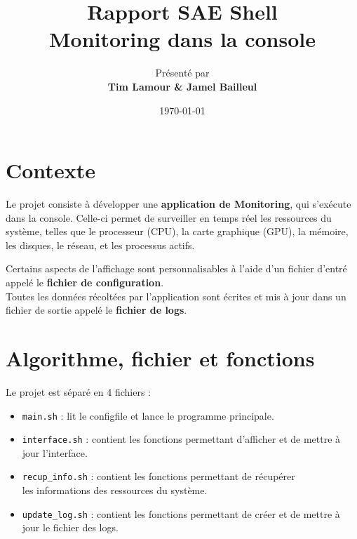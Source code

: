 \documentclass{article}
\title{\Huge \textbf{Rapport SAE Shell} \\[0.5cm] \Large Monitoring dans la console}
\author{\large Présenté par\\ \textbf{Tim Lamour \& Jamel Bailleul}}
\date{\today}
\begin{document}
\maketitle %
\tableofcontents %
\newpage

\section{Contexte}
Le projet consiste à développer une \textbf{application de Monitoring}, qui s'exécute dans la console.
Celle-ci permet de surveiller en temps réel les ressources du système, telles que le processeur (CPU), la carte graphique (GPU), la mémoire, les disques, le réseau, et les processus actifs.
\vspace{1em}

Certains aspects de l'affichage sont personnalisables à l'aide d'un fichier d'entré appelé le \textbf{fichier de configuration}.
\\
Toutes les données récoltées par l'application sont écrites et mis à jour dans un fichier de sortie appelé le \textbf{fichier de logs}.

\section{Algorithme, fichier et fonctions}
Le projet est séparé en 4 fichiers :
\begin{itemize}
    \item \texttt{main.sh} : lit le configfile et lance le programme principale.
    \item \texttt{interface.sh} : contient les fonctions permettant d'afficher et de mettre à jour l'interface.
    \item \texttt{recup\_info.sh} : contient les fonctions permettant de récupérer\\ les informations des ressources du système.
    \item \texttt{update\_log.sh} : contient les fonctions permettant de créer et de mettre à jour le fichier des logs. 
\end{itemize}
\vspace{1em}
\end{document}
